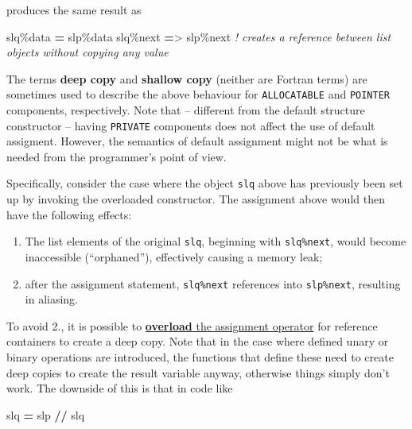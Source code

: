 \documentclass[
]{article}
\newenvironment{Shaded}{}{}
\newcommand{\CommentTok}[1]{\textcolor[rgb]{0.38,0.63,0.69}{\textit{#1}}}
\newcommand{\KeywordTok}[1]{\textcolor[rgb]{0.00,0.44,0.13}{\textbf{#1}}}
\newcommand{\NormalTok}[1]{#1}
\newcommand{\OperatorTok}[1]{\textcolor[rgb]{0.40,0.40,0.40}{#1}}
\providecommand{\tightlist}{%
  \setlength{\itemsep}{0pt}\setlength{\parskip}{0pt}}
\begin{document}
produces the same result as

\begin{Shaded}
\begin{Highlighting}[]
\NormalTok{slq}\OperatorTok{\%}\NormalTok{data }\KeywordTok{=}\NormalTok{ slp}\OperatorTok{\%}\NormalTok{data}
\NormalTok{slq}\OperatorTok{\%}\NormalTok{next }\KeywordTok{=}\OperatorTok{\textgreater{}}\NormalTok{ slp}\OperatorTok{\%}\NormalTok{next  }\CommentTok{! creates a reference between list objects without copying any value}
\end{Highlighting}
\end{Shaded}

The terms \textbf{deep copy} and \textbf{shallow copy} (neither are
Fortran terms) are sometimes used to describe the above behaviour for
\texttt{ALLOCATABLE} and \texttt{POINTER} components, respectively. Note
that -- different from the default structure constructor -- having
\texttt{PRIVATE} components does not affect the use of default
assigment. However, the semantics of default assignment might not be
what is needed from the programmer's point of view.

Specifically, consider the case where the object \texttt{slq} above has
previously been set up by invoking the overloaded constructor. The
assignment above would then have the following effects:

\begin{enumerate}
\def\labelenumi{\arabic{enumi}.}
\tightlist
\item
  The list elements of the original \texttt{slq}, beginning with
  \texttt{slq\%next}, would become inaccessible (``orphaned''),
  effectively causing a memory leak;
\item
  after the assignment statement, \texttt{slq\%next} references into
  \texttt{slp\%next}, resulting in aliasing.
\end{enumerate}

To avoid 2., it is possible to
\href{https://en.wikipedia.org/wiki/Fortran_95_language_features\#Derived-data_types}{\textbf{overload}
the assignment operator} for reference containers to create a deep copy.
Note that in the case where defined unary or binary operations are
introduced, the functions that define these need to create deep copies
to create the result variable anyway, otherwise things simply don't
work. The downside of this is that in code like

\begin{Shaded}
\begin{Highlighting}[]
\NormalTok{slq }\KeywordTok{=}\NormalTok{ slp }\KeywordTok{//}\NormalTok{ slq}
\end{Highlighting}
\end{Shaded}
\end{document}
